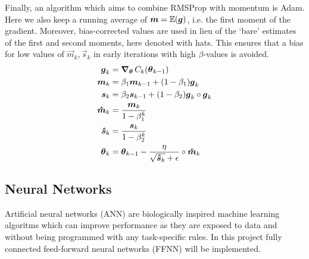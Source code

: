         Finally, an algorithm which aims to combine RMSProp with momentum is Adam. Here we also keep a running average of $\boldsymbol{m} = \operatorname{\mathbb{E}}(\boldsymbol{g})$, i.e. the first moment of the gradient. Moreover, bias-corrected values are used in lieu of the `bare' estimates of the first and second moments, here denoted with hats. This ensures that a bias for low values of $\vec{m}_k, \vec{s}_k$ in early iterations with high $\beta$-values is avoided.
        \begin{subequations}
            \begin{align}
                \boldsymbol{g}_k &= \operatorname{\operatorname{\boldsymbol{\nabla}}_{\boldsymbol{\theta}}} C_k(\boldsymbol{\theta}_{k-1}) \\
                \boldsymbol{m}_k &= \beta_1 \boldsymbol{m}_{k-1} + (1-\beta_1) \boldsymbol{g}_k \\
                \boldsymbol{s}_k &= \beta_2 \boldsymbol{s}_{k-1} + (1-\beta_2) \boldsymbol{g}_k \circ \boldsymbol{g}_k \\
                \boldsymbol{\hat{m}}_k &= \frac{\boldsymbol{m}_k}{1-\beta_1^k} \\
                \boldsymbol{\hat{s}}_k &= \frac{\boldsymbol{s}_k}{1-\beta_2^k} \\
                \boldsymbol{\theta}_k &= \boldsymbol{\theta}_{k-1} - \frac{\eta}{\sqrt{\boldsymbol{\hat{s}}_k}+\epsilon} \circ \boldsymbol{\hat{m}}_k
            \end{align}
        \end{subequations}



    \subsection{Neural Networks}
        Artificial neural networks (ANN) are biologically inspired machine learning algoritms which can improve performance as they are exposed to data and without being programmed with any task-specific rules. In this project fully connected feed-forward neural networks (FFNN) will be implemented. 
